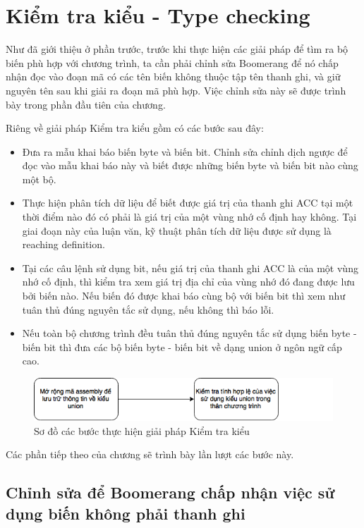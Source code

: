 \chapter{Kiểm tra kiểu - Type checking}

Như đã giới thiệu ở phần trước, trước khi thực hiện các giải pháp để tìm ra bộ biến phù hợp với chương trình, ta cần phải chỉnh sửa Boomerang để nó chấp nhận đọc vào đoạn mã có các tên biến không thuộc tập tên thanh ghi, và giữ nguyên tên sau khi giải ra đoạn mã phù hợp. Việc chỉnh sửa này sẽ được trình bày trong phần đầu tiên của chương.

Riêng về giải pháp Kiểm tra kiểu gồm có các bước sau đây:
\begin{itemize}
\item Đưa ra mẫu khai báo biến byte và biến bit. Chỉnh sửa chỉnh dịch ngược để đọc vào mẫu khai báo này và biết được những biến byte và biến bit nào cùng một bộ.
\item Thực hiện phân tích dữ liệu để biết được giá trị của thanh ghi ACC tại một thời điểm nào đó có phải là giá trị của một vùng nhớ cố định hay không. Tại giai đoạn này của luận văn, kỹ thuật phân tích dữ liệu được sử dụng là reaching definition.
\item Tại các câu lệnh sử dụng bit, nếu giá trị của thanh ghi ACC là của một vùng nhớ cố định, thì kiểm tra xem giá trị địa chỉ của vùng nhớ đó đang được lưu bởi biến nào. Nếu biến đó được khai báo cùng bộ với biến bit thì xem như tuân thủ đúng nguyên tắc sử dụng, nếu không thì báo lỗi.
\item Nếu toàn bộ chương trình đều tuân thủ đúng nguyên tắc sử dụng biến byte - biến bit thì đưa các bộ biến byte - biến bit về dạng union ở ngôn ngữ cấp cao.
\end{itemize}
\begin{figure}
	\centering
	\includegraphics[width=0.7\linewidth]{image/soDoTypeChecking}
	\caption{Sơ đồ các bước thực hiện giải pháp Kiểm tra kiểu}
	\label{fig:sodotypechecking}
\end{figure}

Các phần tiếp theo của chương sẽ trình bày lần lượt các bước này.

\section{Chỉnh sửa để Boomerang chấp nhận việc sử dụng biến không phải thanh ghi}
